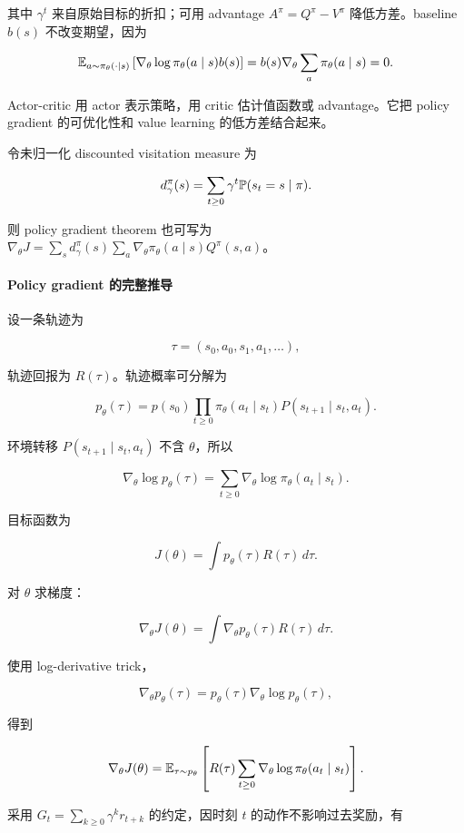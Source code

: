 其中 \(\gamma^t\) 来自原始目标的折扣；可用 advantage \(A^\pi=Q^\pi-V^\pi\) 降低方差。baseline \(b(s)\) 不改变期望，因为

\[
  \mathbb{E}_{a\sim\pi_\theta(\cdot\mid s)}
  \left[
    \nabla_\theta\log\pi_\theta(a\mid s)b(s)
  \right]
  =
  b(s)\nabla_\theta\sum_a\pi_\theta(a\mid s)
  =
  0.
\]

Actor-critic 用 actor 表示策略，用 critic 估计值函数或 advantage。它把 policy gradient 的可优化性和 value learning 的低方差结合起来。

令未归一化 discounted visitation measure 为

\[
  d^\pi_\gamma(s)=\sum_{t\ge0}\gamma^t\mathbb{P}(s_t=s\mid\pi).
\]

则 policy gradient theorem 也可写为 \(\nabla_\theta J=\sum_s d^\pi_\gamma(s)\sum_a\nabla_\theta\pi_\theta(a\mid s)Q^\pi(s,a)\)。

\paragraph{Policy gradient 的完整推导}

设一条轨迹为

\[
  \tau=(s_0,a_0,s_1,a_1,\ldots),
\]

轨迹回报为 \(R(\tau)\)。轨迹概率可分解为

\[
  p_\theta(\tau)
  =
  p(s_0)
  \prod_{t\ge0}
  \pi_\theta(a_t\mid s_t)
  P(s_{t+1}\mid s_t,a_t).
\]

环境转移 \(P(s_{t+1}\mid s_t,a_t)\) 不含 \(\theta\)，所以

\[
  \nabla_\theta\log p_\theta(\tau)
  =
  \sum_{t\ge0}
  \nabla_\theta\log\pi_\theta(a_t\mid s_t).
\]

目标函数为

\[
  J(\theta)
  =
  \int p_\theta(\tau)R(\tau)\,d\tau.
\]

对 \(\theta\) 求梯度：

\[
  \nabla_\theta J(\theta)
  =
  \int
  \nabla_\theta p_\theta(\tau)R(\tau)\,d\tau.
\]

使用 log-derivative trick，

\[
  \nabla_\theta p_\theta(\tau)
  =
  p_\theta(\tau)\nabla_\theta\log p_\theta(\tau),
\]

得到

\[
  \nabla_\theta J(\theta)
  =
  \mathbb{E}_{\tau\sim p_\theta}
  \left[
    R(\tau)
    \sum_{t\ge0}
    \nabla_\theta\log\pi_\theta(a_t\mid s_t)
  \right].
\]

采用 \(G_t=\sum_{k\ge0}\gamma^k r_{t+k}\) 的约定，因时刻 \(t\) 的动作不影响过去奖励，有

